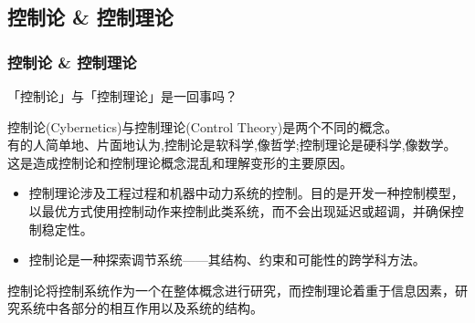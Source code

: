 \documentclass[12pt,AutoFakeBold,aspectratio=43,mathserif]{beamer}
\begin{document}
    \subsection{控制论 \& 控制理论}
    \begin{frame}
        \frametitle{控制论 \& 控制理论}
        \begin{block}{\textnormal{「控制论」与「控制理论」是一回事吗？}}
        \end{block} \pause
        \footnotesize
        控制论(Cybernetics)与控制理论(Control Theory)是两个不同的概念。 \\
        有的人简单地、片面地认为,控制论是软科学,像哲学;控制理论是硬科学,像数学。这是造成控制论和控制理论概念混乱和理解变形的主要原因。 \\
        \begin{itemize}
            \item 控制理论涉及工程过程和机器中动力系统的控制。目的是开发一种控制模型，以最优方式使用控制动作来控制此类系统，而不会出现延迟或超调，并确保控制稳定性。\pause
            \item 控制论是一种探索调节系统——其结构、约束和可能性的跨学科方法。\pause
        \end{itemize}
        控制论将控制系统作为一个在整体概念进行研究，而控制理论着重于信息因素，研究系统中各部分的相互作用以及系统的结构。
        \pause
        
    
    \end{frame}
\end{document}
